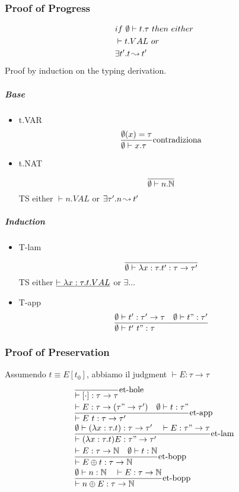 \documentclass{article}
\begin{document}
\subsubsection{Proof of Progress}
\begin{align*}
    & if\ \emptyset\vdash t.\tau\ then\ either \\
    & \vdash t.VAL\ or \\
    & \exists t'.t\operatorname{ \leadsto^{} } t'
\end{align*}
Proof by induction on the typing derivation.
\subparagraph{Base} 
\begin{itemize}
    \item t.VAR
        \begin{align*}
            \st[contradiziona]{\emptyset\vdash x.\tau}{\emptyset(x)=\tau}
        \end{align*}
    \item t.NAT
        \begin{align*}
            \st{\emptyset\vdash n.\N}{}
        \end{align*}
        TS either $\vdash n.VAL$ or $\exists \tau'. n\operatorname{ \leadsto^{} } t'$
\end{itemize}

\subparagraph{Induction}
\begin{itemize}
    \item T-lam
        \begin{align*}
            \st{\emptyset\vdash \lam{x:\tau}{t'}:\tau\to\tau'}{}
        \end{align*}
        TS either $\underline{\vdash \lambda x:\tau.t.VAL}$ or $\exists ...$
    \item T-app
        \begin{align*}
            \st{\emptyset\vdash t'\ t":\tau}{\emptyset\vdash t':\tau'\to\tau \quad \emptyset\vdash t":\tau'}
        \end{align*}
\end{itemize}

\subsubsection{Proof of Preservation}
Assumendo $t\equiv E[t_0]$, abbiamo il judgment $\vdash E:\tau\to\tau$
\begin{align*}
    & \st[et-hole]{\vdash[\cdot]:\tau\to\tau}{} \\
    & \st[et-app]{\vdash E\ t:\tau\to\tau'}{\vdash E:\tau\to(\tau"\to\tau')\quad \emptyset\vdash t:\tau"} \\
    & \st[et-lam]{\vdash (\lam{x:\tau}{t}) E:\tau"\to\tau'}{\emptyset\vdash (\lam{x:\tau}{t}):\tau\to\tau'\quad\vdash E:\tau"\to\tau} \\
    & \st[et-bopp]{\vdash E\bop t:\tau\to\N}{\vdash E:\tau\to\N\quad\emptyset\vdash t:\N} \\
    & \st[et-bopp]{\vdash n\bop E:\tau\to\N}{\emptyset\vdash n:\N\quad\vdash E:\tau\to\N} \\
\end{align*}
\end{document}
